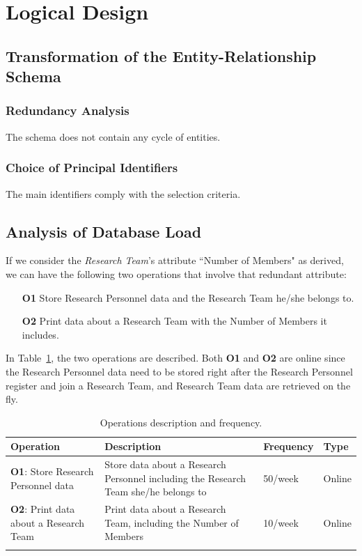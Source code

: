 \section{Logical Design}

\subsection{Transformation of the Entity-Relationship Schema}


\subsubsection{Redundancy Analysis}
The schema does not contain any cycle of entities.

\subsubsection{Choice of Principal Identifiers}
The main identifiers comply with the selection criteria.

\subsection{Analysis of Database Load}
If we consider the \textit{Research Team}'s attribute ``Number of Members" as derived, we can have the following two operations that involve that redundant attribute:
\begin{itemize}
    \item[\textbf{O1}] Store Research Personnel data and the Research Team he/she belongs to.
    \item[\textbf{O2}] Print data about a Research Team with the Number of Members it includes.
\end{itemize}
In Table~\ref{table:4}, the two operations are described. Both \textbf{O1} and \textbf{O2} are online since the Research Personnel data need to be
stored right after the Research Personnel register and join a Research Team, and Research Team data are retrieved on the fly.
\begin{longtable}[width=\textwidth]{|p{}|p{} |p{}|p{}|}
\hline
\textbf{Operation} & \textbf{Description} & \textbf{Frequency} & \textbf{Type} \\
\hline
\textbf{O1}: Store Research Personnel data & Store data about a Research Personnel including the Research Team she/he belongs to &50/week &Online \\
\hline
\textbf{O2}: Print data about a Research Team & Print data about a Research Team, including the Number of Members &10/week &Online \\
\hline

\caption{Operations description and frequency.}
\label{table:4}
\end{longtable}

